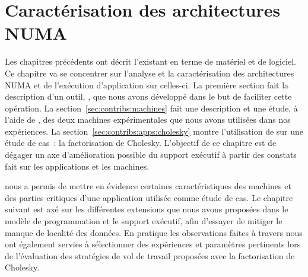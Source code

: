 

\chapter{Caractérisation des architectures NUMA}\label{chap:contrib:characterization}
\chaptertoc

Les chapitres précédents ont décrit l'existant en terme de matériel et de logiciel.
Ce chapitre va se concentrer sur l'analyse et la caractérisation des architectures NUMA et de l'exécution d'application sur celles-ci.
La première section fait la description d'un outil, \outil, que nous avons développé dans le but de faciliter cette opération.
La section~\ref{sec:contribs:machines} fait une description et une étude, à l'aide de \outil, des deux machines expérimentales que nous avons utilisées dans nos expériences.
La section~\ref{sec:contribs:apps:cholesky} montre l'utilisation de \outil sur une étude de cas~: la factorisation de Cholesky.
L'objectif de ce chapitre est de dégager un axe d'amélioration possible du support exécutif à partir des constats fait sur les applications et les machines.






\bigskip
\bigskip

\outil nous a permis de mettre en évidence certaines caractéristiques des machines et des parties critiques d'une application utilisée comme étude de cas.
Le chapitre suivant est axé sur les différentes extensions que nous avons proposées dans le modèle de programmation et le support exécutif, afin d'essayer de mitiger le manque de localité des données.
En pratique les observations faites à travers \outil nous ont également servies à sélectionner des expériences et paramètres pertinents lors de l'évaluation des stratégies de vol de travail proposées avec la factorisation de Cholesky.
